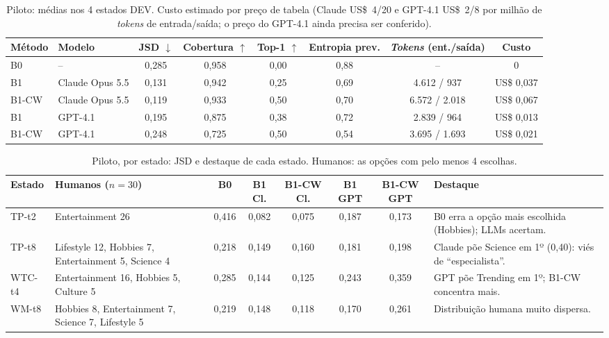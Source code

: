 \documentclass[12pt,oneside,a4paper,chapter=TITLE,english,brazil]{abntex2}
\begin{document}
\begin{table}[htb]
\centering
\caption{Piloto: médias nos 4 estados DEV. Custo estimado por preço de tabela (Claude US\$~4/20 e GPT-4.1 US\$~2/8 por milhão de \textit{tokens} de entrada/saída; o preço do GPT-4.1 ainda precisa ser conferido).}
\label{tab:piloto}
\scriptsize
\begin{tabular}{@{}llcccccc@{}}
\toprule
\textbf{Método} & \textbf{Modelo} & \textbf{JSD $\downarrow$} & \textbf{Cobertura $\uparrow$} & \textbf{Top-1 $\uparrow$} & \textbf{Entropia prev.} & \textbf{\textit{Tokens} (ent./saída)} & \textbf{Custo} \\
\midrule
B0 & -- & 0,285 & 0,958 & 0,00 & 0,88 & -- & 0 \\
B1 & Claude Opus 5.5 & 0,131 & 0,942 & 0,25 & 0,69 & 4.612 / 937 & US\$ 0,037 \\
B1-CW & Claude Opus 5.5 & 0,119 & 0,933 & 0,50 & 0,70 & 6.572 / 2.018 & US\$ 0,067 \\
B1 & GPT-4.1 & 0,195 & 0,875 & 0,38 & 0,72 & 2.839 / 964 & US\$ 0,013 \\
B1-CW & GPT-4.1 & 0,248 & 0,725 & 0,50 & 0,54 & 3.695 / 1.693 & US\$ 0,021 \\
\bottomrule
\end{tabular}
\end{table}

\begin{table}[htb]
\centering
\caption{Piloto, por estado: JSD e destaque de cada estado. Humanos: as opções com pelo menos 4 escolhas.}
\label{tab:pilotoestados}
\scriptsize
\begin{tabularx}{\textwidth}{@{}p{1.2cm}p{3.0cm}cccccY@{}}
\toprule
\textbf{Estado} & \textbf{Humanos ($n=30$)} & \textbf{B0} & \textbf{B1 Cl.} & \textbf{B1-CW Cl.} & \textbf{B1 GPT} & \textbf{B1-CW GPT} & \textbf{Destaque} \\
\midrule
TP-t2 & Entertainment 26 & 0,416 & 0,082 & 0,075 & 0,187 & 0,173 & B0 erra a opção mais escolhida (Hobbies); LLMs acertam. \\
TP-t8 & Lifestyle 12, Hobbies 7, Entertainment 5, Science 4 & 0,218 & 0,149 & 0,160 & 0,181 & 0,198 & Claude põe Science em 1º (0,40): viés de ``especialista''. \\
WTC-t4 & Entertainment 16, Hobbies 5, Culture 5 & 0,285 & 0,144 & 0,125 & 0,243 & 0,359 & GPT põe Trending em 1º; B1-CW concentra mais. \\
WM-t8 & Hobbies 8, Entertainment 7, Science 7, Lifestyle 5 & 0,219 & 0,148 & 0,118 & 0,170 & 0,261 & Distribuição humana muito dispersa. \\
\bottomrule
\end{tabularx}
\end{table}
\end{document}
